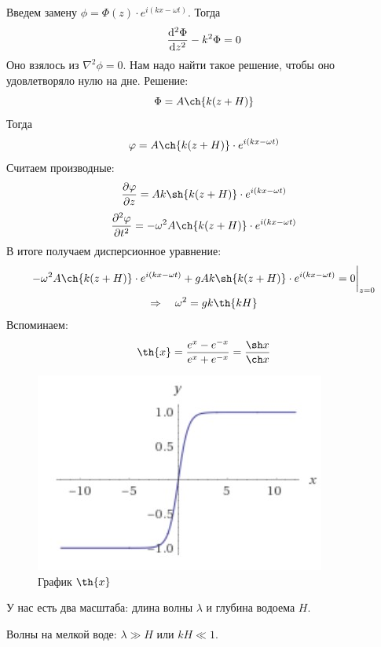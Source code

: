 Введем замену $\phi=\Phi(z)\cdot e^{i(kx- \omega t)}$. Тогда
\begin{equation}
	\dv[2]{\Phi}{z}-k^2\Phi=0
\end{equation}
Оно взялось из $\nabla^2\phi=0$. Нам надо найти такое решение, чтобы оно удовлетворяло нулю на дне. 
Решение:
\begin{equation}
	\Phi=A\ch{k(z+H)}
\end{equation}
Тогда
\begin{equation}
	\phi=A\ch{k(z+H)}\cdot e^{i(kx- \omega t)}
\end{equation}
Считаем производные:
\begin{equation}
	\pdv{\phi}{z}=Ak\sh{k(z+H)}\cdot e^{i(kx- \omega t)}
\end{equation}
\begin{equation}
	\pdv[2]{\phi}{t}=-\omega^2A\ch{k(z+H)}\cdot e^{i(kx- \omega t)}
\end{equation}
В итоге получаем дисперсионное уравнение:
\begin{gather}
	-\omega^2A\ch{k(z+H)}\cdot e^{i(kx- \omega t)}+gAk\sh{k(z+H)}\cdot e^{i(kx- \omega t)}=0 \bigg|_{z=0}
	\\ \Rightarrow \quad
	\omega^2=gk\th{kH}
\end{gather}
Вспоминаем:
\begin{equation}
	\th{x}=\frac{e^x-e^{-x}}{e^{x}+e^{-x}}=\frac{\sh x}{\ch x}
\end{equation}

\begin{figure}[H]
    \centering
    \includegraphics[scale=1]{photo/tanh.jpg}
    \caption{График $\th{x}$}
    \label{fig:figure1}
\end{figure}

У нас есть два масштаба: длина волны $\lambda$ и глубина водоема $H$.

Волны на мелкой воде: $\lambda \gg H$ или $kH\ll 1$.

